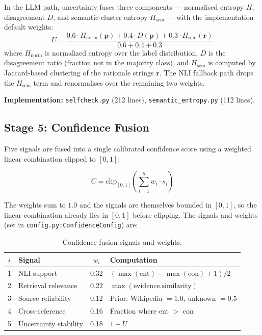 \documentclass[12pt, a4paper, oneside]{report}
\begin{document}
In the LLM path, uncertainty fuses three components --- normalised entropy $H$, disagreement $D$, and semantic-cluster entropy $H_{\text{sem}}$ --- with the implementation default weights:
\begin{equation}
U = \frac{0.6 \cdot H_{\text{norm}}(\mathbf{p}) + 0.4 \cdot D(\mathbf{p}) + 0.3 \cdot H_{\text{sem}}(\mathbf{r})}{0.6 + 0.4 + 0.3}
\tag{Eq.\ 5}
\end{equation}
where $H_{\text{norm}}$ is normalized entropy over the label distribution, $D$ is the disagreement ratio (fraction not in the majority class), and $H_{\text{sem}}$ is computed by Jaccard-based clustering of the rationale strings $\mathbf{r}$. The NLI fallback path drops the $H_{\text{sem}}$ term and renormalises over the remaining two weights.

\textbf{Implementation:} \texttt{selfcheck.py} (212 lines), \texttt{semantic\_entropy.py} (112 lines).

\subsection{Stage 5: Confidence Fusion}
\label{sec:confidence}

Five signals are fused into a single calibrated confidence score using a weighted linear combination clipped to $[0,1]$:

\begin{equation}
C = \mathrm{clip}_{[0,1]}\!\left(\sum_{i=1}^{5} w_i \cdot s_i \right)
\tag{Eq.\ 6}
\end{equation}

The weights sum to $1.0$ and the signals are themselves bounded in $[0,1]$, so the linear combination already lies in $[0,1]$ before clipping. The signals and weights (set in \texttt{config.py:ConfidenceConfig}) are:

\begin{table}[H]
\centering
\caption{Confidence fusion signals and weights.}
\label{tab:confidence}
\begin{tabular}{c l c l}
\toprule
$i$ & \textbf{Signal} & $w_i$ & \textbf{Computation} \\
\midrule
1 & NLI support & 0.32 & $(\max(\text{ent}) - \max(\text{con}) + 1) / 2$ \\
2 & Retrieval relevance & 0.22 & $\max(\text{evidence.similarity})$ \\
3 & Source reliability & 0.12 & Prior: Wikipedia $= 1.0$, unknown $= 0.5$ \\
4 & Cross-reference & 0.16 & Fraction where ent $>$ con \\
5 & Uncertainty stability & 0.18 & $1 - U$ \\
\bottomrule
\end{tabular}
\end{table}
\end{document}
